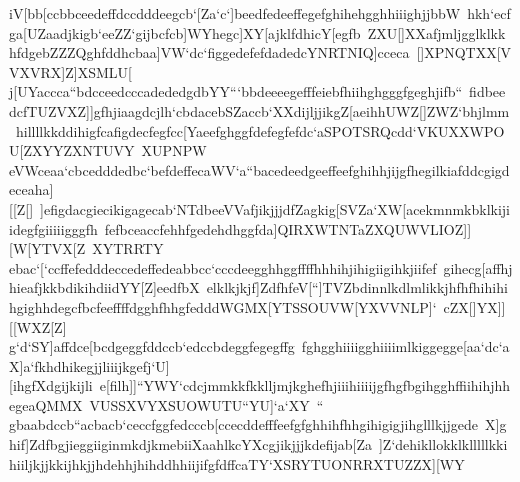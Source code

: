 {{ \hbox{iV[bb[ccbbceedeffdccdddeegcb`[Za`c`]beedfedeeffegefghihehgghhiiighjjbbW%
 hkh`ecfga[UZaadjkigb`eeZZ`gijbcfcb]WYhegc]XY[ajklfdhicY[egfb%
 ZXU[]XXafjmljgglklkkhfdgebZZZQghfddhcbaa]VW`dc`figgedefefdadedcYNRTNIQ]cceca%
 []XPNQTXX[VVXVRX]Z]XSMLU[}
 \hbox{j[UYaccca``bdcceedcccadededgdbYY```bbdeeeegefffeiebfhiihghgggfgeghjifb``%
 fidbeedcfTUZVXZ]]gfhjiaagdcjlh`cbdacebSZaccb`XXdijljjikgZ[aeihhUWZ[]ZWZ`bhjlmm%
 hillllkkddihigfcafigdecfegfcc[Yaeefghggfdefegfefdc`aSPOTSRQcdd`VKUXXWPOU[ZXYYZXNTUVY%
 XUPNPW}
 \hbox{eVWceaa`cbcedddedbc`befdeffecaWV`a``bacedeedgeeffeefghihhjijgfhegilkiafddcgigdeceaha][[Z[]%
 ]efigdacgiecikigagecab`NTdbeeVVafjikjjjdfZagkig[SVZa`XW[acekmnmkbklkijiidegfgiiiiigggfh%
 fefbceaccfehhfgedehdhggfda]QIRXWTNTaZXQUWVLIOZ]][W[YTVX[Z%
 XYTRRTY}
 \hbox{ebac`[`ccffefedddeccedeffedeabbcc`cccdeegghhggffffhhhihjihigiigihkjiifef%
 gihecg[affhjhieafjkkbdikihdiidYY[Z]eedfbX%
 elklkjkjf]ZdfhfeV[``]TVZbdinnlkdlmlikkjhfhfhihihihgighhdegcfbcfeeffffdgghfhhgfedddWGMX[YTSSOUVW[YXVVNLP]`%
 cZX[]YX]][[WXZ[Z]}
 \hbox{g`d`SY]affdce[bcdgeggfddccb`edccbdeggfegegffg%
 fghgghiiiigghiiiimlkiggegge[aa`dc`aX]a`fkhdhikegjjliiijkgefj`U][ihgfXdgijkijli%
 e[filh]]``YWY`cdcjmmkkfkklljmjkghefhjiiihiiiijgfhgfbgihgghffiihihjhhegeaQMMX%
 VUSSXVYXSUOWUTU``YU]`a`XY%
 ``}
 \hbox{gbaabdccb``acbacb`ceccfggfedcccb[ccecddefffeefgfghhihfhhgihigigjihglllkjjgede%
 X]ghif]ZdfbgjieggiiginmkdjkmebiiXaahlkcYXcgjikjjjkdefijab[Za%
 ]Z`dehikllokklklllllkkihiiljkjjkkijhkjjhdehhjhihddhhiijifgfdffcaTY`XSRYTUONRRXTUZZX][WY%
}}}
